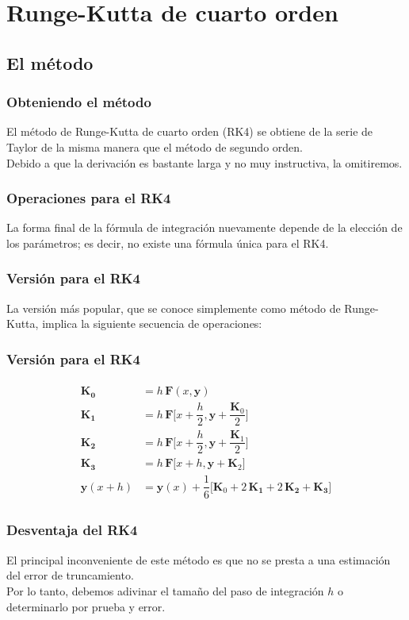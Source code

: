 \documentclass[12pt]{beamer}
\begin{document}
\section{Runge-Kutta de cuarto orden}
\subsection{El método}

\begin{frame}
\frametitle{Obteniendo el método}
El \textcolor{cadmiumgreen}{método de Runge-Kutta de cuarto orden} (RK4) se obtiene de la serie de Taylor de la misma manera que el método de segundo orden.
\\
\bigskip
\pause
Debido a que la derivación es bastante larga y no muy instructiva, la omitiremos.
\end{frame}
\begin{frame}
\frametitle{Operaciones para el RK4}
La forma final de la fórmula de integración nuevamente depende de la elección de los parámetros; \pause es decir, no existe una fórmula única para el RK4.
\end{frame}
\begin{frame}
\frametitle{Versión para el RK4}
La versión más popular, que se conoce simplemente como \textcolor{cornellred}{método de Runge-Kutta}, implica la siguiente secuencia de operaciones:
\end{frame}
\begin{frame}
\frametitle{Versión para el RK4}
\begin{align}
\begin{aligned}
\mathbf{K_{0}} &= h \, \mathbf{F} (x, \mathbf{y}) \\
\mathbf{K_{1}} &= h \, \mathbf{F} \bigg[x + \dfrac{h}{2}, \mathbf{y} + \dfrac{\mathbf{K}_{0}}{2} \bigg] \\
\mathbf{K_{2}} &= h \, \mathbf{F} \bigg[x + \dfrac{h}{2}, \mathbf{y} + \dfrac{\mathbf{K}_{1}}{2} \bigg] \\
\mathbf{K_{3}} &= h \, \mathbf{F} \big[x + h, \mathbf{y} + \mathbf{K}_{2} \big] \\
\mathbf{y} (x + h) &= \mathbf{y} (x) + \dfrac{1}{6} \bigg[ \mathbf{K}_{0} + 2 \, \mathbf{K_{1}} + 2 \, \mathbf{K_{2}} + \mathbf{K_{3}} \bigg]
\end{aligned}
\label{eq:ecuacion_07_10}
\end{align}
\end{frame}
\begin{frame}
\frametitle{Desventaja del RK4}
El principal inconveniente de este método es que no se presta a una estimación del error de truncamiento.
\\
\bigskip
\pause
Por lo tanto, debemos adivinar el tamaño del paso de integración $h$ o determinarlo por prueba y error.
\end{frame}
\end{document}
